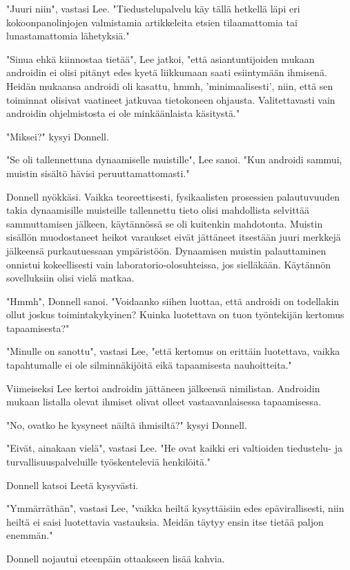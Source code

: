 "Juuri niin", vastasi Lee. "Tiedustelupalvelu käy tällä hetkellä läpi eri kokoonpanolinjojen valmistamia artikkeleita etsien tilaamattomia tai lunastamattomia lähetyksiä."


"Sinua ehkä kiinnostaa tietää", Lee jatkoi, "että asiantuntijoiden mukaan androidin ei olisi pitänyt edes kyetä liikkumaan saati esiintymään ihmisenä. Heidän mukaansa androidi oli kasattu, hmmh, 'minimaalisesti', niin, että sen toiminnat olisivat vaatineet jatkuvaa tietokoneen ohjausta. Valitettavasti vain androidin ohjelmistosta ei ole minkäänlaista käsitystä."


"Miksei?" kysyi Donnell.


"Se oli tallennettuna dynaamiselle muistille", Lee sanoi. "Kun androidi sammui, muistin sisältö hävisi peruuttamattomasti."


Donnell nyökkäsi. Vaikka teoreettisesti, fysikaalisten prosessien palautuvuuden takia dynaamisille muisteille tallennettu tieto olisi mahdollista selvittää sammuttamisen jälkeen, käytännössä se oli kuitenkin mahdotonta. Muistin sisällön muodostaneet heikot varaukset eivät jättäneet itsestään juuri merkkejä jälkeensä purkautuessaan ympäristöön. Dynaamisen muistin palauttaminen onnistui kokeellisesti vain laboratorio-olosuhteissa, jos sielläkään. Käytännön sovelluksiin olisi vielä matkaa.


"Hmmh", Donnell sanoi. "Voidaanko siihen luottaa, että androidi on todellakin ollut joskus toimintakykyinen? Kuinka luotettava on tuon työntekijän kertomus tapaamisesta?"


"Minulle on sanottu", vastasi Lee, "että kertomus on erittäin luotettava, vaikka tapahtumalle ei ole silminnäkijöitä eikä tapaamisesta nauhoitteita."


Viimeiseksi Lee kertoi androidin jättäneen jälkeensä nimilistan. Androidin mukaan listalla olevat ihmiset olivat olleet vastaavanlaisessa tapaamisessa.


"No, ovatko he kysyneet näiltä ihmisiltä?" kysyi Donnell.


"Eivät, ainakaan vielä", vastasi Lee. "He ovat kaikki eri valtioiden tiedustelu- ja turvallisuuspalveluille työskenteleviä henkilöitä."


Donnell katsoi Leetä kysyvästi.


"Ymmärräthän", vastasi Lee, "vaikka heiltä kysyttäisiin edes epävirallisesti, niin heiltä ei saisi luotettavia vastauksia. Meidän täytyy ensin itse tietää paljon enemmän."


Donnell nojautui eteenpäin ottaakseen lisää kahvia.


